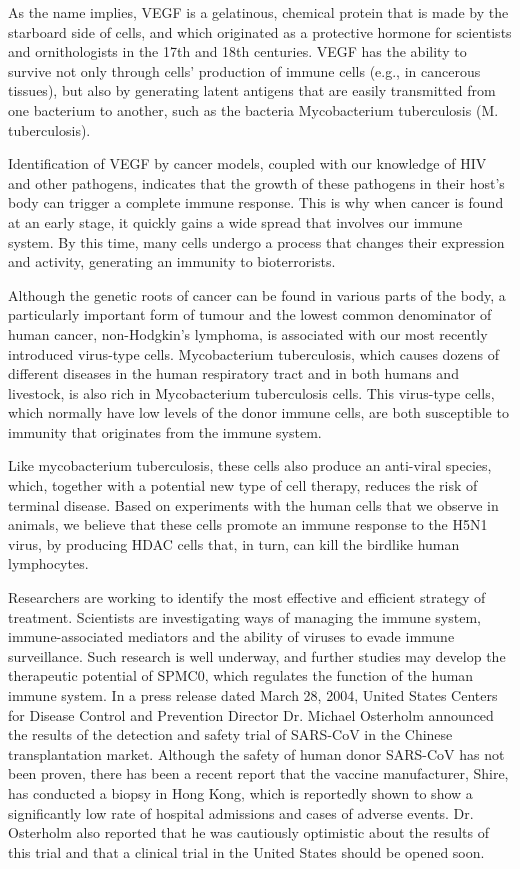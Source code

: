 \documentclass{article}
\begin{document}
As the name implies, VEGF is a gelatinous, chemical protein that is made by the starboard side of cells, and which originated as a protective hormone for scientists and ornithologists in the 17th and 18th centuries. VEGF has the ability to survive not only through cells’ production of immune cells (e.g., in cancerous tissues), but also by generating latent antigens that are easily transmitted from one bacterium to another, such as the bacteria Mycobacterium tuberculosis (M. tuberculosis).

Identification of VEGF by cancer models, coupled with our knowledge of HIV and other pathogens, indicates that the growth of these pathogens in their host’s body can trigger a complete immune response. This is why when cancer is found at an early stage, it quickly gains a wide spread that involves our immune system. By this time, many cells undergo a process that changes their expression and activity, generating an immunity to bioterrorists.

Although the genetic roots of cancer can be found in various parts of the body, a particularly important form of tumour and the lowest common denominator of human cancer, non-Hodgkin’s lymphoma, is associated with our most recently introduced virus-type cells. Mycobacterium tuberculosis, which causes dozens of different diseases in the human respiratory tract and in both humans and livestock, is also rich in Mycobacterium tuberculosis cells. This virus-type cells, which normally have low levels of the donor immune cells, are both susceptible to immunity that originates from the immune system.

Like mycobacterium tuberculosis, these cells also produce an anti-viral species, which, together with a potential new type of cell therapy, reduces the risk of terminal disease. Based on experiments with the human cells that we observe in animals, we believe that these cells promote an immune response to the H5N1 virus, by producing HDAC cells that, in turn, can kill the birdlike human lymphocytes.

Researchers are working to identify the most effective and efficient strategy of treatment. Scientists are investigating ways of managing the immune system, immune-associated mediators and the ability of viruses to evade immune surveillance. Such research is well underway, and further studies may develop the therapeutic potential of SPMC0, which regulates the function of the human immune system. In a press release dated March 28, 2004, United States Centers for Disease Control and Prevention Director Dr. Michael Osterholm announced the results of the detection and safety trial of SARS-CoV in the Chinese transplantation market. Although the safety of human donor SARS-CoV has not been proven, there has been a recent report that the vaccine manufacturer, Shire, has conducted a biopsy in Hong Kong, which is reportedly shown to show a significantly low rate of hospital admissions and cases of adverse events. Dr. Osterholm also reported that he was cautiously optimistic about the results of this trial and that a clinical trial in the United States should be opened soon.
\end{document}
